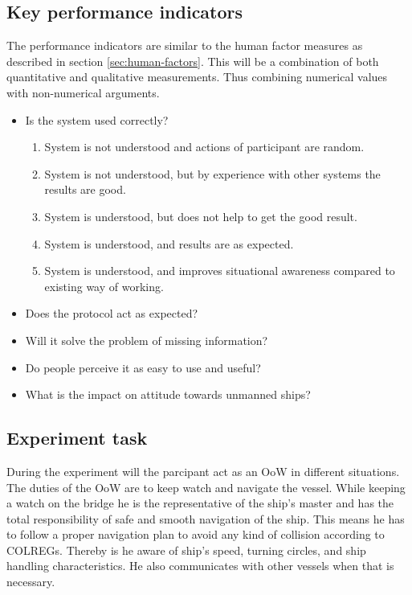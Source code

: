 \subsection{Key performance indicators}
The performance indicators are similar to the human factor measures as described in section \ref{sec:human-factors}. This will be a combination of both quantitative and qualitative measurements. Thus combining numerical values with non-numerical arguments.
\begin{itemize}
	\item Is the system used correctly? 
	\begin{enumerate}
		\item System is not understood and actions of participant are random.
		\item System is not understood, but by experience with other systems the results are good.
		\item System is understood, but does not help to get the good result.
		\item System is understood, and results are as expected.
		\item System is understood, and improves situational awareness compared to existing way of working.
	\end{enumerate}
	\item Does the protocol act as expected?
	\item Will it solve the problem of missing information?
	\item Do people perceive it as easy to use and useful?
	\item What is the impact on attitude towards unmanned ships?
\end{itemize}

\subsection{Experiment task}
\label{ssec:experiment-task}
During the experiment will the parcipant act as an \acf{OoW} in different situations. The duties of the \ac{OoW} are to keep watch and navigate the vessel. While keeping a watch on the bridge he is the representative of the ship’s master and has the total responsibility of safe and smooth navigation of the ship. This means he has to follow a proper navigation plan to avoid any kind of collision according to COLREGs. Thereby is he aware of ship’s speed, turning circles, and ship handling characteristics. He also communicates with other vessels when that is necessary.

